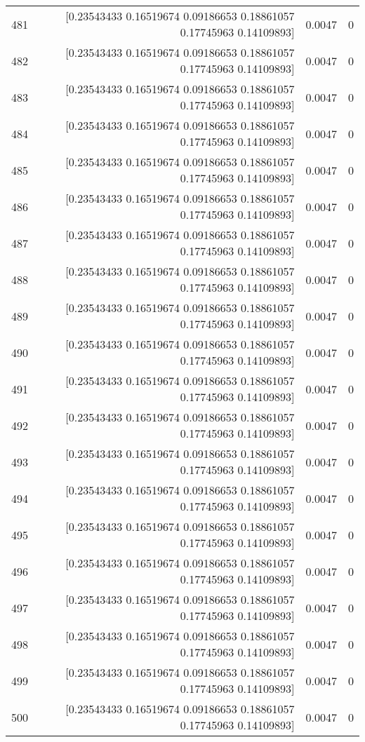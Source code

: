 \begin{longtable}{lrrr}
481 & [0.23543433 0.16519674 0.09186653 0.18861057 0.17745963 0.14109893] & 0.0047 & 0 \\
482 & [0.23543433 0.16519674 0.09186653 0.18861057 0.17745963 0.14109893] & 0.0047 & 0 \\
483 & [0.23543433 0.16519674 0.09186653 0.18861057 0.17745963 0.14109893] & 0.0047 & 0 \\
484 & [0.23543433 0.16519674 0.09186653 0.18861057 0.17745963 0.14109893] & 0.0047 & 0 \\
485 & [0.23543433 0.16519674 0.09186653 0.18861057 0.17745963 0.14109893] & 0.0047 & 0 \\
486 & [0.23543433 0.16519674 0.09186653 0.18861057 0.17745963 0.14109893] & 0.0047 & 0 \\
487 & [0.23543433 0.16519674 0.09186653 0.18861057 0.17745963 0.14109893] & 0.0047 & 0 \\
488 & [0.23543433 0.16519674 0.09186653 0.18861057 0.17745963 0.14109893] & 0.0047 & 0 \\
489 & [0.23543433 0.16519674 0.09186653 0.18861057 0.17745963 0.14109893] & 0.0047 & 0 \\
490 & [0.23543433 0.16519674 0.09186653 0.18861057 0.17745963 0.14109893] & 0.0047 & 0 \\
491 & [0.23543433 0.16519674 0.09186653 0.18861057 0.17745963 0.14109893] & 0.0047 & 0 \\
492 & [0.23543433 0.16519674 0.09186653 0.18861057 0.17745963 0.14109893] & 0.0047 & 0 \\
493 & [0.23543433 0.16519674 0.09186653 0.18861057 0.17745963 0.14109893] & 0.0047 & 0 \\
494 & [0.23543433 0.16519674 0.09186653 0.18861057 0.17745963 0.14109893] & 0.0047 & 0 \\
495 & [0.23543433 0.16519674 0.09186653 0.18861057 0.17745963 0.14109893] & 0.0047 & 0 \\
496 & [0.23543433 0.16519674 0.09186653 0.18861057 0.17745963 0.14109893] & 0.0047 & 0 \\
497 & [0.23543433 0.16519674 0.09186653 0.18861057 0.17745963 0.14109893] & 0.0047 & 0 \\
498 & [0.23543433 0.16519674 0.09186653 0.18861057 0.17745963 0.14109893] & 0.0047 & 0 \\
499 & [0.23543433 0.16519674 0.09186653 0.18861057 0.17745963 0.14109893] & 0.0047 & 0 \\
500 & [0.23543433 0.16519674 0.09186653 0.18861057 0.17745963 0.14109893] & 0.0047 & 0 \\
\end{longtable}